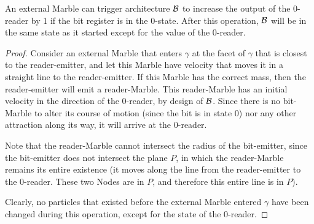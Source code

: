\begin{lemma}
    An external Marble can trigger architecture $\mathcal{B}$ to increase the output of the 0-reader by 1 if the bit register is in the 0-state. After this operation, $\mathcal{B}$ will be in the same state as it started except for the value of the 0-reader.
    \label{lemma:0-reader}
\end{lemma}
\begin{proof}
    Consider an external Marble that enters $\gamma$ at the facet of $\gamma$ that is closest to the reader-emitter, 
    and let this Marble have velocity that moves it in a straight line to the reader-emitter. 
    If this Marble has the correct mass, then the reader-emitter will emit a reader-Marble. 
    This reader-Marble has an initial velocity in the direction of the 0-reader, by design of $\mathcal{B}$. 
    Since there is no bit-Marble to alter its course of motion (since the bit is in state 0) 
    nor any other attraction along its way, it will arrive at the 0-reader. 
    
    Note that the reader-Marble cannot intersect the radius of the bit-emitter, 
    since the bit-emitter does not intersect the plane $P$, in which the reader-Marble remains its entire existence 
    (it moves along the line from the reader-emitter to the 0-reader. These two Nodes are in $P$, and therefore this entire line is in $P$).
    
    Clearly, no particles that existed before the external Marble entered $\gamma$ have been changed during this operation, 
    except for the state of the 0-reader.
\end{proof}

